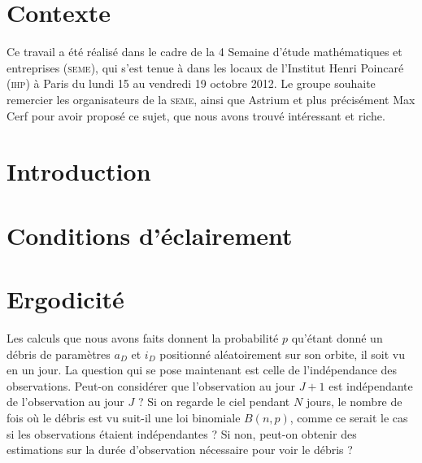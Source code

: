 \documentclass[a4paper,11pt]{article}
\numberwithin{section}{part}
\begin{document}
\section{Contexte}

Ce travail a été réalisé dans le cadre de la 4\ieme{} 
Semaine d'étude mathématiques et entreprises (\textsc{seme}), qui s'est tenue à
dans les locaux de l'Institut Henri Poincaré (\textsc{ihp}) à Paris du lundi 15
au vendredi 19 octobre 2012. Le groupe souhaite remercier les
organisateurs de la \textsc{seme}, ainsi que Astrium et plus précisément Max
Cerf pour avoir proposé ce sujet, que nous avons trouvé intéressant et
riche.




\section{Introduction}








\section{Conditions d'éclairement}
\section{Ergodicité}
Les calculs que nous avons faits donnent la probabilité $p$ qu'étant
donné un débris de paramètres $a_{D}$ et $i_{D}$ positionné
aléatoirement sur son orbite, il soit vu en un jour. La question qui
se pose maintenant est celle de l'indépendance des
observations. Peut-on considérer que l'observation au jour $J+1$ est
indépendante de l'observation au jour $J$ ? Si on regarde le ciel
pendant $N$ jours, le nombre de fois où le débris est vu suit-il une
loi binomiale $B(n,p)$, comme ce serait le cas si les observations
étaient indépendantes ? Si non, peut-on obtenir des estimations sur la
durée d'observation nécessaire pour voir le débris ?
\end{document}
